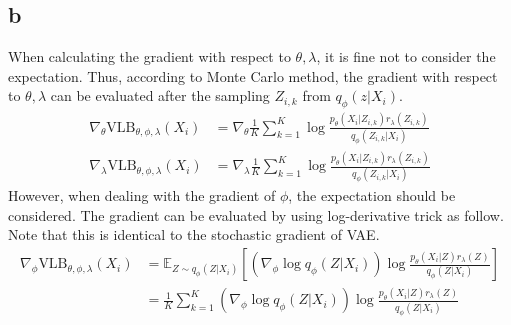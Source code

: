 \documentclass[10pt]{article}
\begin{document}
\subsection*{b}
When calculating the gradient with respect to $\theta,\lambda$, it is fine not to consider the expectation. Thus, according to Monte Carlo method, the gradient with respect to $\theta,\lambda$ can be evaluated after the sampling $Z_{i,k}$ from $q_\phi(z|X_i)$.
\begin{align*}
    \nabla_\theta \text{VLB}_{\theta,\phi,\lambda}(X_i) &= \nabla_\theta \frac{1}{K}\sum_{k=1}^K \log \frac{p_\theta(X_i|Z_{i,k})r_\lambda(Z_{i,k})}{q_\phi(Z_{i,k}|X_i)} \\
    \nabla_\lambda \text{VLB}_{\theta,\phi,\lambda}(X_i) &= \nabla_\lambda \frac{1}{K}\sum_{k=1}^K \log \frac{p_\theta(X_i|Z_{i,k})r_\lambda(Z_{i,k})}{q_\phi(Z_{i,k}|X_i)}
\end{align*}
However, when dealing with the gradient of $\phi$, the expectation should be considered. 
The gradient can be evaluated by using log-derivative trick as follow. Note that this is identical to the stochastic gradient of VAE.
\begin{align*}
    \nabla_\phi \text{VLB}_{\theta,\phi,\lambda}(X_i) &= \mathbb{E}_{Z\sim q_\phi(Z|X_i)}\left[\left(\nabla_\phi \log q_\phi(Z|X_i)\right) \log \frac{p_\theta(X_i|Z)r_\lambda(Z)}{q_\phi(Z|X_i)}\right] \\
    &= \frac{1}{K}\sum_{k=1}^K \left(\nabla_\phi \log q_\phi(Z|X_i)\right) \log \frac{p_\theta(X_i|Z)r_\lambda(Z)}{q_\phi(Z|X_i)}
\end{align*}
\end{document}
